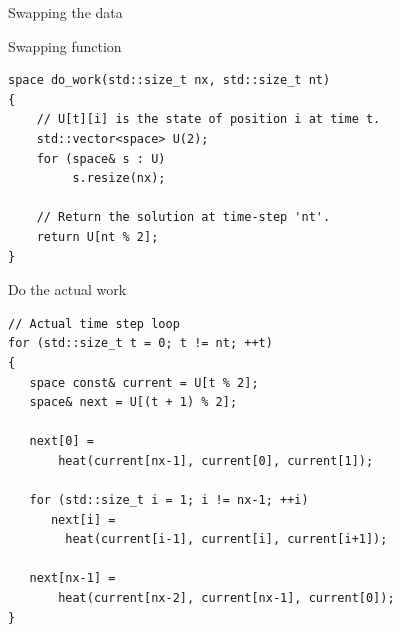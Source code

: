 \documentclass[12pt,t]{beamer}
\begin{document}
\begin{frame}[fragile]{Swapping the data}
\vspace{-0.5cm}
\begin{center}
\end{center}

\begin{block}{Swapping function}
\begin{lstlisting}
space do_work(std::size_t nx, std::size_t nt)
{
    // U[t][i] is the state of position i at time t.
    std::vector<space> U(2);
    for (space& s : U)
         s.resize(nx);

    // Return the solution at time-step 'nt'.
    return U[nt % 2];
}
\end{lstlisting}
\end{block}
\end{frame}

\begin{frame}[fragile]{Do the actual work}

\begin{lstlisting}
// Actual time step loop
for (std::size_t t = 0; t != nt; ++t)
{
   space const& current = U[t % 2];
   space& next = U[(t + 1) % 2];

   next[0] = 
       heat(current[nx-1], current[0], current[1]);

   for (std::size_t i = 1; i != nx-1; ++i)
      next[i] = 
      	heat(current[i-1], current[i], current[i+1]);

   next[nx-1] = 
       heat(current[nx-2], current[nx-1], current[0]);
}
\end{lstlisting}


\end{frame}
\end{document}
